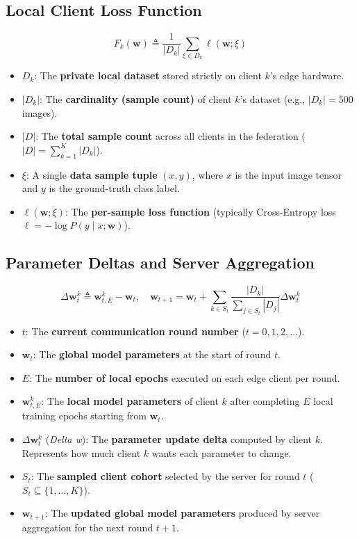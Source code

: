 \documentclass[11pt,a4paper,titlepage]{report}
\begin{document}
\subsection{Local Client Loss Function}
\begin{equation}
    F_k(\mathbf{w}) \triangleq \frac{1}{|D_k|} \sum_{\xi \in D_k} \ell(\mathbf{w}; \xi)
\end{equation}
\begin{itemize}[leftmargin=*]
    \item $D_k$: The \textbf{private local dataset} stored strictly on client $k$'s edge hardware.
    \item $|D_k|$: The \textbf{cardinality (sample count)} of client $k$'s dataset (e.g., $|D_k| = 500$ images).
    \item $|D|$: The \textbf{total sample count} across all clients in the federation ($|D| = \sum_{k=1}^K |D_k|$).
    \item $\xi$: A single \textbf{data sample tuple} $(x, y)$, where $x$ is the input image tensor and $y$ is the ground-truth class label.
    \item $\ell(\mathbf{w}; \xi)$: The \textbf{per-sample loss function} (typically Cross-Entropy loss $\ell = -\log P(y \mid x; \mathbf{w})$).
\end{itemize}

\subsection{Parameter Deltas and Server Aggregation}
\begin{equation}
    \Delta\mathbf{w}_t^k \triangleq \mathbf{w}_{t, E}^k - \mathbf{w}_t, \quad \mathbf{w}_{t+1} = \mathbf{w}_t + \sum_{k \in S_t} \frac{|D_k|}{\sum_{j \in S_t} |D_j|} \Delta\mathbf{w}_t^k
\end{equation}
\begin{itemize}[leftmargin=*]
    \item $t$: The \textbf{current communication round number} ($t = 0, 1, 2, \dots$).
    \item $\mathbf{w}_t$: The \textbf{global model parameters} at the start of round $t$.
    \item $E$: The \textbf{number of local epochs} executed on each edge client per round.
    \item $\mathbf{w}_{t, E}^k$: The \textbf{local model parameters} of client $k$ after completing $E$ local training epochs starting from $\mathbf{w}_t$.
    \item $\Delta\mathbf{w}_t^k$ (\textit{Delta w}): The \textbf{parameter update delta} computed by client $k$. Represents how much client $k$ wants each parameter to change.
    \item $S_t$: The \textbf{sampled client cohort} selected by the server for round $t$ ($S_t \subseteq \{1, \dots, K\}$).
    \item $\mathbf{w}_{t+1}$: The \textbf{updated global model parameters} produced by server aggregation for the next round $t+1$.
\end{itemize}
\end{document}
